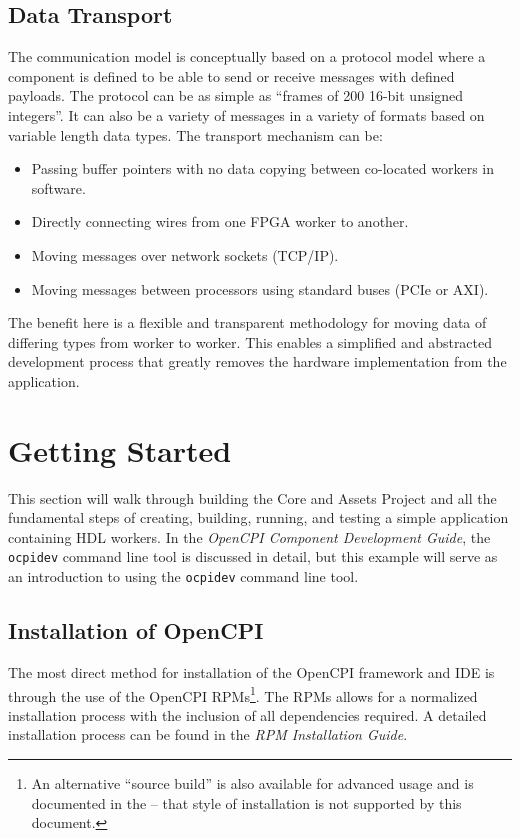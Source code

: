 \subsection{Data Transport}
\label{subsec:Data_Transport}
The communication model is conceptually based on a protocol model where a component is defined to be able to send or receive messages
with defined payloads.
The protocol can be as simple as ``frames of 200 16-bit unsigned integers''.
It can also be a variety of messages in a variety of formats based on variable length data types.
The transport mechanism can be:
\begin{itemize}
\item Passing buffer pointers with no data copying between co-located workers in software.
\item Directly connecting wires from one FPGA worker to another.
\item Moving messages over network sockets (TCP/IP).
\item Moving messages between processors using standard buses (PCIe or AXI).
\end{itemize}

The benefit here is a flexible and transparent methodology for moving data of differing types from worker to worker. This enables a simplified and abstracted development process that greatly removes the hardware implementation from the application.

\newpage
\section{Getting Started}
This section will walk through building the Core and Assets Project and all the fundamental steps of creating, building, running, and testing a simple application containing HDL workers. In the \textit{OpenCPI Component Development Guide}, the \verb+ocpidev+ command line tool is discussed in detail, but this example will serve as an introduction to using the \verb+ocpidev+ command line tool.

\subsection{Installation of OpenCPI}
The most direct method for installation of the OpenCPI framework and IDE is through the use of the OpenCPI RPMs\footnote{
An alternative ``source build'' is also available for advanced usage and is documented in the  -- that style of installation is not supported by this document.
}.
The RPMs allows for a normalized installation process with the inclusion of all dependencies required. A detailed installation process can be found in the \textit{RPM Installation Guide}.


